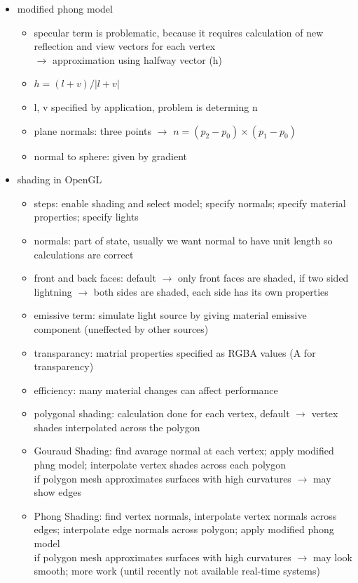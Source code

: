 \documentclass[11pt,a4paper]{article}
\begin{document}
\begin{itemize}
	\item modified phong model
	\begin{itemize}
		\item specular term is problematic, because it requires calculation of new reflection and view vectors for each vertex\\
		$\rightarrow$ approximation using halfway vector (h)
		\item $h=(l+v)/|l+v|$
		\item l, v specified by application, problem is determing n
		\item plane normals: three points $\rightarrow$  $n=(p_2-p_0)\times(p_1-p_0)$
		\item normal to sphere: given by gradient
		
	\end{itemize}
	\item shading in OpenGL
	\begin{itemize}
		\item steps: enable shading and select model; specify normals; specify material properties; specify lights
		\item normals: part of state, usually we want normal to have unit length so calculations are correct
		\item front and back faces: default $\rightarrow$ only front faces are shaded, if two sided lightning $\rightarrow$ both sides are shaded, each side has its own properties
		\item emissive term: simulate light source by giving material emissive component (uneffected by other sources)
		\item transparancy: matrial properties specified as RGBA values (A for transparency)
		\item efficiency: many material changes can affect performance
		\item polygonal shading: calculation done for each vertex, default $\rightarrow$ vertex shades interpolated across the polygon
		\item Gouraud Shading: find avarage normal at each vertex; apply modified phng model; interpolate vertex shades across each polygon\\
			if polygon mesh approximates surfaces with high curvatures $\rightarrow$ may show edges
		\item Phong Shading: find vertex normals, interpolate vertex normals across edges; interpolate edge normals across polygon; apply modified phong model\\
			if polygon mesh approximates surfaces with high curvatures $\rightarrow$ may look smooth; more work (until recently not available real-time systems)
	\end{itemize}
\end{itemize}
\end{document}
